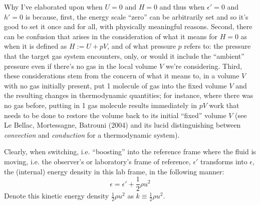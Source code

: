 \documentclass[10pt]{amsart}
\begin{document}
\begin{multicols*}{2}
Why I've elaborated upon when $U=0$ and $H=0$ and thus when $\epsilon'=0$ and $h'=0$ is because, first, the energy scale ``zero'' can be arbitrarily set and so it's good to set it once and for all, with physically meaningful reasons.  Second, there can be confusion that arises in the consideration of what it means for $H=0$ as when it is defined as $H:=U+pV$, and of what pressure $p$ refers to: the pressure that the target gas system encounters, only, or would it include the ``ambient'' pressure even if there's no gas in the local volume $V$ we're considering.  Third, these considerations stem from the concern of what it means to, in a volume $V$ with no gas initially present, put 1 molecule of gas into the fixed volume $V$ and the resulting changes in thermodynamic quantities; for instance, where there was no gas before, putting in 1 gas molecule results immediately in $pV$ work that needs to be done to restore the volume back to its initial ``fixed'' volume $V$ (see Le Bellac, Mortessagne, Batrouni (2004) \cite{MLeBellacFMortessagneGBatrouni2004} and its lucid distinguishing between \emph{convection} and \emph{conduction} for a thermodynamic system).

Clearly, when switching, i.e. ``boosting'' into the reference frame where the fluid is moving, i.e. the observer's or laboratory's frame of reference, $\epsilon'$ transforms into $\epsilon$, the (internal) energy density in this lab frame, in the following manner:
\begin{equation}
\epsilon = \epsilon' + \frac{1}{2} \rho u^2
  \end{equation}
Denote this kinetic energy density $\frac{1}{2} \rho u^2$ as $k \equiv \frac{1}{2} \rho u^2$.



\end{multicols*}
\end{document}
